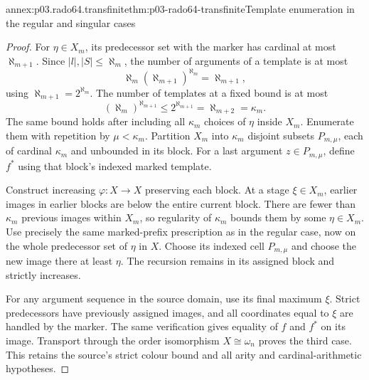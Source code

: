 \begin{annexitem}{annex:p03.rado64.transfinite}{thm:p03-rado64-transfinite}{Template enumeration in the regular and singular cases}
\begin{proof}
For \(\eta\in X_m\), its predecessor set with the marker has cardinal
at most \(\aleph_{m+1}\).
Since \(|l|,|S|\leq\aleph_m\), the number of arguments of a template
is at most
\[
 \aleph_m(\aleph_{m+1})^{\aleph_m}
 =\aleph_{m+1},
\]
using \(\aleph_{m+1}=2^{\aleph_m}\).
The number of templates at a fixed bound is at most
\[
 (\aleph_m)^{\aleph_{m+1}}
 \leq2^{\aleph_{m+1}}=\aleph_{m+2}=\kappa_m.
\]
The same bound holds after including all \(\kappa_m\) choices of \(\eta\)
inside \(X_m\). Enumerate them with repetition by \(\mu<\kappa_m\).
Partition \(X_m\) into \(\kappa_m\) disjoint subsets \(P_{m,\mu}\),
each of cardinal \(\kappa_m\) and unbounded in its block.
For a last argument \(z\in P_{m,\mu}\), define \(f^*\) using that
block's indexed marked template.

Construct increasing \(\varphi:X\to X\) preserving each block.
At a stage \(\xi\in X_m\), earlier images in earlier blocks are below
the entire current block. There are fewer than \(\kappa_m\) previous
images within \(X_m\), so regularity of \(\kappa_m\) bounds them by
some \(\eta\in X_m\).
Use precisely the same marked-prefix prescription as in the regular case,
now on the whole predecessor set of \(\eta\) in \(X\).
Choose its indexed cell \(P_{m,\mu}\) and choose the new image there at
least \(\eta\).
The recursion remains in its assigned block and strictly increases.

For any argument sequence in the source domain, use its final maximum
\(\xi\). Strict predecessors have previously assigned images, and all
coordinates equal to \(\xi\) are handled by the marker.
The same verification gives equality of \(f\) and \(f^*\) on its image.
Transport through the order isomorphism \(X\cong\omega_n\) proves the
third case. This retains the source's strict colour bound and all
arity and cardinal-arithmetic hypotheses.
\end{proof}
\end{annexitem}
